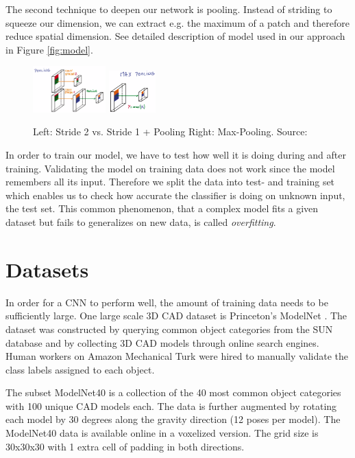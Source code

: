 \documentclass[10pt,twocolumn,letterpaper]{article}
\begin{document}
The second technique to deepen our network is pooling. Instead of striding to squeeze our dimension, we can extract e.g. the maximum of a patch and therefore reduce spatial dimension. 
See detailed description of model used in our approach in Figure \ref{fig:model}.

\begin{figure}[h]
	\label{fig:pooling}
	\includegraphics[width=0.25\textwidth]{figures/con_max}
	\includegraphics[width=0.16\textwidth]{figures/max}
	\caption{Left: Stride 2 vs. Stride 1 + Pooling \quad Right: Max-Pooling. Source: \cite{udacity}}
\end{figure}

In order to train our model, we have to test how well it is doing during and after training. 
Validating the model on training data does not work since the model remembers all its input. Therefore we split the data into test- and training set which enables us to check how accurate the classifier is doing on unknown input, the test set. This common phenomenon, that a complex model fits a given dataset but fails to generalizes on new data, is called \textit{overfitting}.

\section{Datasets}
\label{data:modelnet}

In order for a CNN to perform well, the amount of training data needs to be sufficiently large. One large scale 3D CAD dataset is Princeton's 
ModelNet \cite{shape}. The dataset was constructed by querying common object categories from the SUN database \cite{sun} and 
by collecting 3D CAD models through online search engines. Human workers on Amazon Mechanical Turk were hired 
to manually validate the class labels assigned to each object.

The subset ModelNet40 is a collection of the 40 most common object categories with 100 unique CAD models each. The data is further augmented
by rotating each model by 30 degrees along the gravity direction (12 poses per model). 
The ModelNet40 data is available online in a voxelized version. The grid size is 30x30x30 with 1 extra cell of padding in both directions.
\end{document}
